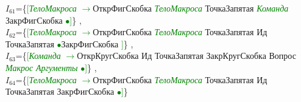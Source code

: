 \documentclass[a0]{a0poster}
\begin{document}
$I_{61}$=\{\textcolor{Green}{[}\textcolor{Green}{\textit{ТелоМакроса}} \textcolor{Green}{$\to$}ОткрФигСкобка \textcolor{Green}{\textit{ТелоМакроса}} ТочкаЗапятая \textcolor{Green}{\textit{Команда}} ЗакрФигСкобка \textcolor{Green}{$\bullet$}\textcolor{Green}{]}\}
,\\
$I_{62}$=\{\textcolor{Green}{[}\textcolor{Green}{\textit{ТелоМакроса}} \textcolor{Green}{$\to$}ОткрФигСкобка \textcolor{Green}{\textit{ТелоМакроса}} ТочкаЗапятая Ид ТочкаЗапятая \textcolor{Green}{$\bullet$}ЗакрФигСкобка \textcolor{Green}{]}\}
,\\
$I_{63}$=\{\textcolor{Green}{[}\textcolor{Green}{\textit{Команда}} \textcolor{Green}{$\to$}ОткрКругСкобка Ид ТочкаЗапятая ЗакрКругСкобка Вопрос \textcolor{Green}{\textit{Макрос}} \textcolor{Green}{\textit{Аргументы}} \textcolor{Green}{$\bullet$}\textcolor{Green}{]}\}
,\\
$I_{64}$=\{\textcolor{Green}{[}\textcolor{Green}{\textit{ТелоМакроса}} \textcolor{Green}{$\to$}ОткрФигСкобка \textcolor{Green}{\textit{ТелоМакроса}} ТочкаЗапятая Ид ТочкаЗапятая ЗакрФигСкобка \textcolor{Green}{$\bullet$}\textcolor{Green}{]}\}
\end{document}
